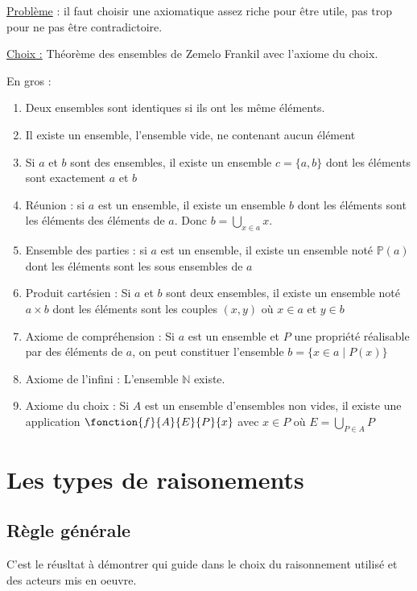 \documentclass{prepacours}
\begin{document}
\underline{Problème} : il faut choisir une axiomatique assez riche pour être utile, 
pas trop pour ne pas être contradictoire. 

\underline{Choix :} Théorème des ensembles de Zemelo Frankil avec l'axiome du choix.

En gros : 

\begin{enumerate}
    \item Deux ensembles sont identiques si ils ont les même éléments. 
    \item Il existe un ensemble, l'ensemble vide, ne contenant aucun élément
    \item Si $a$ et $b$ sont des ensembles, il existe un ensemble $c = \{a, b\}$
            dont les éléments sont exactement $a$ et $b$
    \item Réunion : si $a$ est un ensemble, il existe un ensemble $b$ dont les éléments
        sont les éléments des éléments de $a$. Donc $b = \bigcup_{x \in a} x$.
    \item Ensemble des parties : si $a$ est un ensemble, il existe un ensemble noté
        $\mathbb P(a)$ dont les éléments sont les sous ensembles de $a$
    \item Produit cartésien : Si $a$ et $b$ sont deux ensembles, il existe un ensemble
        noté $a \times b$ dont les éléments sont les couples $(x, y)$ où $x \in a$ 
        et $y \in b$
    \item Axiome de compréhension : Si $a$ est un ensemble et $P$ une propriété réalisable
        par des éléments de $a$, on peut constituer l'ensemble $b = \{x \in a \mid P(x)\}$
    \item Axiome de l'infini : L'ensemble $\mathbb N$ existe.
    \item Axiome du choix : Si $A$ est un ensemble d'ensembles non vides, il existe une 
        application $\fonction{f}{A}{E}{P}{x}$ avec $x \in P$ où $E = \bigcup_{P \in A} P$
\end{enumerate}

\section{Les types de raisonements}

\subsection{Règle générale}

C'est le réusltat à démontrer qui guide dans le choix du raisonnement utilisé et des
acteurs mis en oeuvre. 
\end{document}
